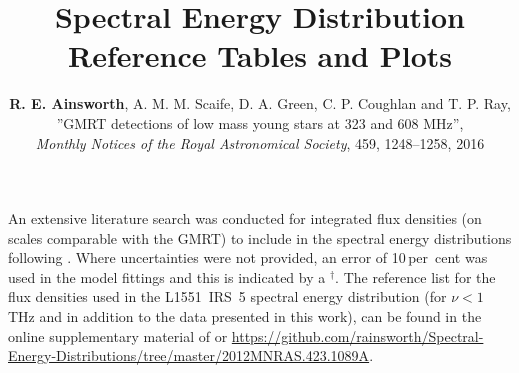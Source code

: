 \documentclass[9pt]{extarticle}   	%
\title{Spectral Energy Distribution Reference Tables and Plots}
\author{\textbf{R. E. Ainsworth}, A. M. M. Scaife, D. A. Green, C. P. Coughlan and T. P. Ray, \\ ''GMRT detections of low mass young stars at 323 and 608 MHz'', \\ \textit{Monthly Notices of the Royal Astronomical Society}, 459, 1248--1258, 2016}
\date{}							%
\begin{document}
\maketitle





An extensive literature search was conducted for integrated flux densities (on scales comparable with the GMRT) to include in the spectral energy distributions following \citet{2012MNRAS.423.1089A}. Where uncertainties were not provided, an error of 10\,per~cent was used in the model fittings and this is indicated by a $^{\dag}$. The reference list for the flux densities used in the L1551~IRS~5 spectral energy distribution (for $\nu<1$\,THz and in addition to the data presented in this work), can be found in the online supplementary material of \citet{2012MNRAS.423.1089A} or \url{https://github.com/rainsworth/Spectral-Energy-Distributions/tree/master/2012MNRAS.423.1089A}.
\end{document}
